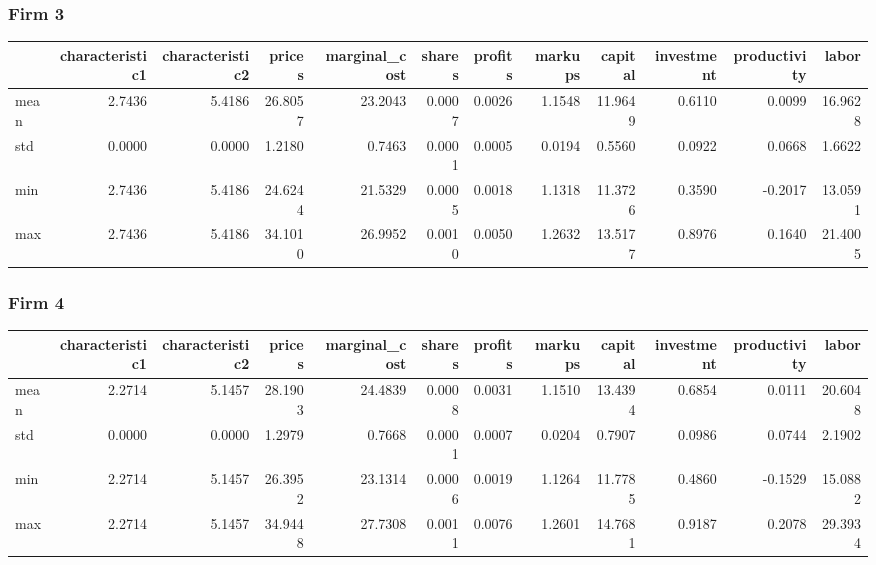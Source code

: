  \subsubsection*{Firm 3}
\begin{tabular}{lrrrrrrrrrrr}
\toprule
{} &  characteristic1 &  characteristic2 &  prices &  marginal\_cost &  shares &  profits &  markups &  capital &  investment &  productivity &   labor \\
\midrule
mean &           2.7436 &           5.4186 & 26.8057 &        23.2043 &  0.0007 &   0.0026 &   1.1548 &  11.9649 &      0.6110 &        0.0099 & 16.9628 \\
std  &           0.0000 &           0.0000 &  1.2180 &         0.7463 &  0.0001 &   0.0005 &   0.0194 &   0.5560 &      0.0922 &        0.0668 &  1.6622 \\
min  &           2.7436 &           5.4186 & 24.6244 &        21.5329 &  0.0005 &   0.0018 &   1.1318 &  11.3726 &      0.3590 &       -0.2017 & 13.0591 \\
max  &           2.7436 &           5.4186 & 34.1010 &        26.9952 &  0.0010 &   0.0050 &   1.2632 &  13.5177 &      0.8976 &        0.1640 & 21.4005 \\
\bottomrule
\end{tabular}


 \subsubsection*{Firm 4}
\begin{tabular}{lrrrrrrrrrrr}
\toprule
{} &  characteristic1 &  characteristic2 &  prices &  marginal\_cost &  shares &  profits &  markups &  capital &  investment &  productivity &   labor \\
\midrule
mean &           2.2714 &           5.1457 & 28.1903 &        24.4839 &  0.0008 &   0.0031 &   1.1510 &  13.4394 &      0.6854 &        0.0111 & 20.6048 \\
std  &           0.0000 &           0.0000 &  1.2979 &         0.7668 &  0.0001 &   0.0007 &   0.0204 &   0.7907 &      0.0986 &        0.0744 &  2.1902 \\
min  &           2.2714 &           5.1457 & 26.3952 &        23.1314 &  0.0006 &   0.0019 &   1.1264 &  11.7785 &      0.4860 &       -0.1529 & 15.0882 \\
max  &           2.2714 &           5.1457 & 34.9448 &        27.7308 &  0.0011 &   0.0076 &   1.2601 &  14.7681 &      0.9187 &        0.2078 & 29.3934 \\
\bottomrule
\end{tabular}



